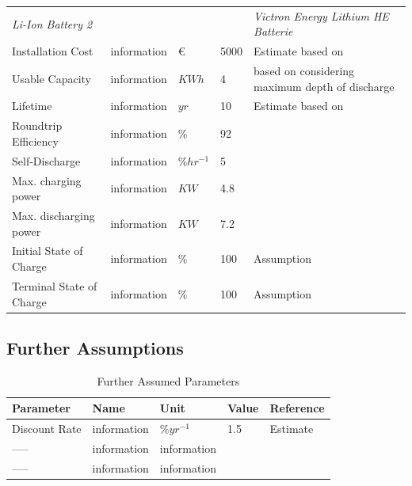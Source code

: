 \documentclass[
	11pt,								%
	DIV10,								%
	a4paper,         					%
	oneside,							%
	headheight=20pt,					%
	footheight=20pt,					%
    parskip=full,						%
    listof=totoc,						%
	bibliography=totoc,					%
	index=totoc,						%
]{scrartcl}
\begin{document}
\begin{table}[H]
\begin{tabular}{lllll}
		\textit{Li-Ion Battery 2} & & & & \textit{Victron Energy Lithium HE Batterie} \\
		Installation Cost              & information     	& \euro  				& 5000				& Estimate based on \cite{VictronEnergyLithium2018}   \\
		Usable Capacity				   & information 		& $KWh$ 				& 4 				& based on \cite{LithiumIonenHEHigh2018} considering maximum depth of discharge\\
		Lifetime			               & information     	& $yr$  				& 10 				& Estimate based on \cite{LithiumIonenHEHigh2018}   \\
		Roundtrip Efficiency           & information     	& $\%$  				& 92 				& \cite{LAUINGER201624}    \\
		Self-Discharge		           & information     	& $\%hr^{-1}$  			& 5					& \cite{LAUINGER201624}   \\	
		Max. charging power            & information    	& $KW$  				& 4.8				& \cite{LithiumIonenHEHigh2018}    \\
		Max. discharging power         & information     	& $KW$   				& 7.2				& \cite{LithiumIonenHEHigh2018}    \\
		Initial State of Charge        & information     	& $\%$  				& 100 				& Assumption	   \\
		Terminal State of Charge       & information     	& $\%$  				& 100 				& Assumption   \\	
		\hline
	\end{tabular}
\end{table}

\subsection{Further Assumptions}

\begin{table}[H]
	\centering
	\caption{Further Assumed Parameters}
	\begin{tabular}{lllll}
		\hline
		\textbf{Parameter}			& \textbf{Name}			& \textbf{Unit}			& \textbf{Value}			&\textbf{Reference}     \\ \hline
		Discount Rate              	& information     		& $\% yr^{-1}$  		& 1.5						& Estimate   \\
		-----			            & information     		& information  			& &    \\
		-----					    & information     		& information  			& &    \\		
		\hline
	\end{tabular}
\end{table}
\end{document}

